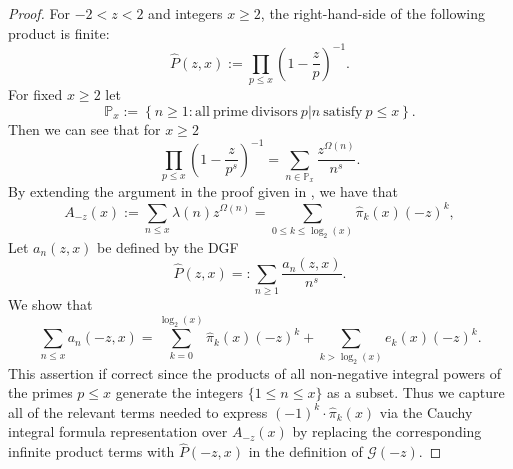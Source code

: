 \documentclass[11pt,reqno,a4letter]{article}
\numberwithin{figure}{section}
\numberwithin{table}{section}
\theoremstyle{plain}
\numberwithin{theorem}{section}
\theoremstyle{definition}
\begin{document}
\begin{proof}
\label{proofOf_theorem_GFs_SymmFuncs_SumsOfRecipOfPowsOfPrimes} 
For $-2 < z < 2$ and integers $x \geq 2$, 
the right-hand-side of the following product is finite: 
\[
\widehat{P}(z, x) := \prod_{p \leq x} \left(1 - \frac{z}{p}\right)^{-1}. 
\]
For fixed $x \geq 2$ let 
\[
\mathbb{P}_x := \left\{n \geq 1: \mathrm{ all\ prime\ divisors\ } 
     p|n \mathrm{\ satisfy\ } p \leq x\right\}. 
\]
Then we can see that for $x \geq 2$ 
\begin{equation} 
\label{eqn_proof_tag_PHatFiniteTruncProdFactorOfGz_v2} 
\prod_{p \leq x} \left(1 - \frac{z}{p^s}\right)^{-1} = \sum_{n \in \mathbb{P}_x} 
     \frac{z^{\Omega(n)}}{n^s}. 
\end{equation} 
By extending the argument in the proof given in 
\cite[\S 7.4]{MV}, we have that 
\[
A_{-z}(x) := \sum_{n \leq x} \lambda(n) z^{\Omega(n)} = 
     \sum_{0 \leq k \leq \log_2(x)} \widehat{\pi}_k(x) (-z)^k, 
\] 
Let $a_n(z, x)$ be defined by the DGF 
\[
\widehat{P}(z, x) =: \sum_{n \geq 1} \frac{a_n(z, x)}{n^s}. 
\]
We show that 
\[
\sum_{n \leq x} a_n(-z, x) = 
     \sum_{k=0}^{\log_2(x)} \widehat{\pi}_k(x) (-z)^k + 
     \sum_{k > \log_2(x)} e_k(x) (-z)^{k}. 
\]
This assertion if correct since the products of all non-negative integral powers of the 
primes $p \leq x$ generate the integers $\{1 \leq n \leq x\}$ as a subset. 
Thus we capture all of the relevant terms needed to express 
$(-1)^{k} \cdot \widehat{\pi}_k(x)$ 
via the Cauchy integral formula representation over $A_{-z}(x)$ by 
replacing the corresponding infinite product terms with 
$\widehat{P}(-z, x)$ in the definition of $\mathcal{G}(-z)$. 


\end{proof}
\end{document}

